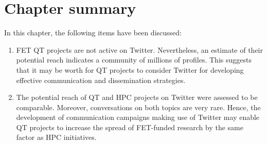 \section{Chapter summary} 
In this chapter, the following items have been discussed: 

\begin{enumerate}
 \item FET QT projects are not active on Twitter. Nevertheless, an estimate of their potential reach indicates a community of millions of profiles. This suggests that it may be worth for QT projects to consider Twitter for developing effective communication and dissemination strategies.
 \item The potential reach of QT and HPC projects on Twitter were assessed to be comparable. Moreover, conversations on both topics are very rare. Hence, the development of communication campaigns making use of Twitter may enable QT projects to increase the spread of FET-funded research by the same factor as HPC initiatives.         
\end{enumerate}